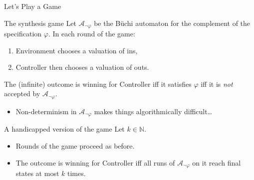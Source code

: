 \documentclass[aspectratio=169]{beamer}
\begin{document}
\begin{frame}{Let's Play a Game}
  \begin{block}{The synthesis game}
    Let $\mathcal{A}_{\lnot \varphi}$ be the B\"uchi automaton for the
    complement of the specification $\varphi$. In each round of the game:
    \begin{enumerate}
      \item Environment chooses a valuation of ins,
      \item Controller then chooses a valuation of outs.
    \end{enumerate}
    The (infinite) outcome is \alert{winning for Controller} iff it
    satisfies $\varphi$ iff it is \emph{not} accepted by $\mathcal{A}_{\lnot
    \varphi}$.
    \begin{itemize}
      \item Non-determinism in $\mathcal{A}_{\lnot \varphi}$ makes things
        algorithmically difficult\dots
    \end{itemize}
  \end{block}
  \pause
  \begin{block}{A handicapped version of the game}
    Let $k \in \mathbb{N}$.
    \begin{itemize}
      \item Rounds of the game proceed as before.
      \item The outcome is winning for Controller iff all runs of
        $\mathcal{A}_{\lnot \varphi}$ on it reach final states \alert{at most $k$
        times}.
    \end{itemize}
  \end{block}
\end{frame}
\end{document}
